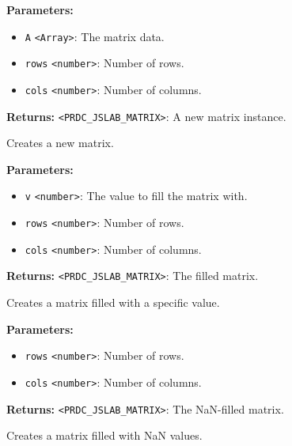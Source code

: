 \documentclass[12pt,a4paper]{article}
\begin{document}
\noindent \textbf{Parameters:}
\begin{itemize}
  \item \texttt{A} \texttt{<Array>}: The matrix data.
  \item \texttt{rows} \texttt{<number>}: Number of rows.
  \item \texttt{cols} \texttt{<number>}: Number of columns.
\end{itemize}

\noindent \textbf{Returns:} \texttt{<PRDC\_JSLAB\_MATRIX>}: A new matrix instance.

\noindent Creates a new matrix.

\vspace{5mm}
\noindent {}


\noindent \textbf{Parameters:}
\begin{itemize}
  \item \texttt{v} \texttt{<number>}: The value to fill the matrix with.
  \item \texttt{rows} \texttt{<number>}: Number of rows.
  \item \texttt{cols} \texttt{<number>}: Number of columns.
\end{itemize}

\noindent \textbf{Returns:} \texttt{<PRDC\_JSLAB\_MATRIX>}: The filled matrix.

\noindent Creates a matrix filled with a specific value.

\vspace{5mm}
\noindent {}


\noindent \textbf{Parameters:}
\begin{itemize}
  \item \texttt{rows} \texttt{<number>}: Number of rows.
  \item \texttt{cols} \texttt{<number>}: Number of columns.
\end{itemize}

\noindent \textbf{Returns:} \texttt{<PRDC\_JSLAB\_MATRIX>}: The NaN-filled matrix.

\noindent Creates a matrix filled with NaN values.

\vspace{5mm}
\noindent {}
\end{document}
